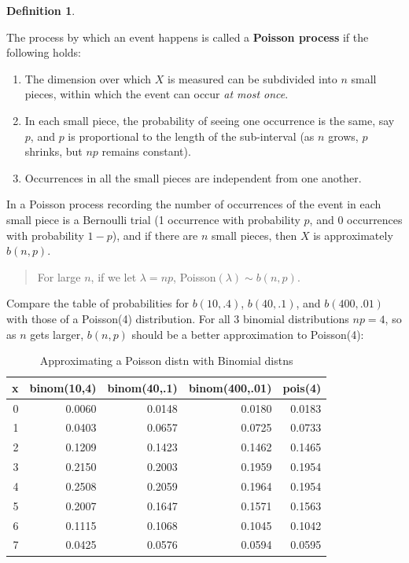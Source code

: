 \documentclass[
]{book}
\providecommand{\tightlist}{%
  \setlength{\itemsep}{0pt}\setlength{\parskip}{0pt}}
\theoremstyle{definition}
\newtheorem{definition}{Definition}[chapter]
\theoremstyle{definition}
\theoremstyle{definition}
\theoremstyle{definition}
\theoremstyle{remark}
\begin{document}
\begin{definition}
\protect\hypertarget{def:def-pois-process-R}{}\label{def:def-pois-process-R}

The process by which an event happens is called a \textbf{Poisson process} if the following holds:

\begin{enumerate}
\def\labelenumi{\arabic{enumi}.}
\tightlist
\item
  The dimension over which \(X\) is measured can be subdivided into \(n\) small pieces, within which the event can occur \emph{at most once}.
\item
  In each small piece, the probability of seeing one occurrence is the same, say \(p\), and \(p\) is proportional to the length of the sub-interval (as \(n\) grows, \(p\) shrinks, but \(np\) remains constant).
\item
  Occurrences in all the small pieces are independent from one another.
\end{enumerate}

\end{definition}

In a Poisson process recording the number of occurrences of the event in each small piece is a Bernoulli trial (1 occurrence with probability \(p\), and 0 occurrences with probability \(1-p\)), and if there are \(n\) small pieces, then \(X\) is approximately \(b(n,p)\).

\begin{quote}
For large \(n\), if we let \(\lambda = np\), Poisson\((\lambda)\sim b(n,p)\).
\end{quote}

Compare the table of probabilities for \(b(10,.4)\), \(b(40,.1)\), and \(b(400,.01)\) with those of a Poisson(4) distribution. For all 3 binomial distributions \(np = 4\), so as \(n\) gets larger, \(b(n,p)\) should be a better approximation to Poisson(4):

\begin{table}
\centering
\caption{\label{tab:unnamed-chunk-162}Approximating a Poisson distn with Binomial distns}
\centering
\begin{tabular}[t]{r|r|r|r|r}
\hline
x & binom(10,4) & binom(40,.1) & binom(400,.01) & pois(4)\\
\hline
0 & 0.0060 & 0.0148 & 0.0180 & 0.0183\\
\hline
1 & 0.0403 & 0.0657 & 0.0725 & 0.0733\\
\hline
2 & 0.1209 & 0.1423 & 0.1462 & 0.1465\\
\hline
3 & 0.2150 & 0.2003 & 0.1959 & 0.1954\\
\hline
4 & 0.2508 & 0.2059 & 0.1964 & 0.1954\\
\hline
5 & 0.2007 & 0.1647 & 0.1571 & 0.1563\\
\hline
6 & 0.1115 & 0.1068 & 0.1045 & 0.1042\\
\hline
7 & 0.0425 & 0.0576 & 0.0594 & 0.0595\\
\hline
\end{tabular}
\end{table}
\end{document}
